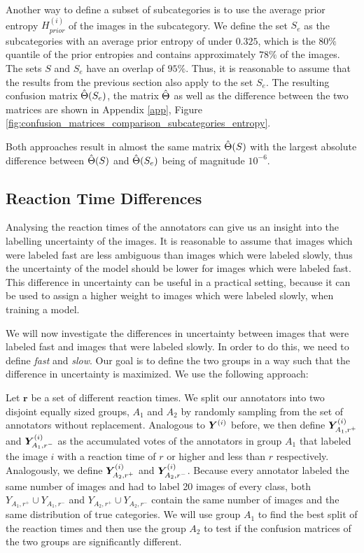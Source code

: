 Another way to define a subset of subcategories is to use the average prior
entropy $H_{prior}^{(i)}$ of the images in the subcategory. We define the set
$S_e$ as the subcategories with an average prior entropy of under $0.325$, which
is the $80\%$ quantile of the prior entropies and contains approximately $78\%$ of
the images. The sets $S$ and $S_e$ have an overlap of $95\%$. Thus, it is
reasonable to assume that the results from the previous section also apply to
the set $S_e$. The resulting confusion matrix $\hat{\Theta}(S_e)$, the matrix
$\hat{\Theta}$ as well as the difference between the two matrices are shown in
Appendix \ref{app}, Figure
\ref{fig:confusion_matrices_comparison_subcategories_entropy}.\bigskip

Both approaches result in almost the same matrix $\hat{\Theta}(S)$ with the largest
absolute difference between $\hat{\Theta}(S)$ and $\hat{\Theta}(S_e)$ being of magnitude
$10^{-6}$.

\subsection{Reaction Time Differences}

Analysing the reaction times of the annotators can give us an insight into the
labelling uncertainty of the images. It is reasonable to assume that images
which were labeled fast are less ambiguous than images which were labeled slowly, thus
the uncertainty of the model should be lower for images which were labeled fast.
This difference in uncertainty can be useful in a practical setting, because
it can be used to assign a higher weight to images which were labeled slowly, when
training a model.\bigskip

We will now investigate the differences in uncertainty between images that were
labeled fast and images that were labeled slowly. In order to do this, we need 
to define \textit{fast} and \textit{slow}. Our goal is to define the two groups
in a way such that the difference in uncertainty is maximized. We use the following
approach:\bigskip

Let $\bm{r}$ be a set of different reaction times. We split our annotators into
two disjoint equally sized groups, $A_1$ and $A_2$ by randomly sampling from the
set of annotators without replacement. Analogous to $\bm{Y}^{(i)}$ before, we then
define $\bm{Y}_{A_1, r^+}^{(i)}$ and $\bm{Y}_{A_1,r^-}^{(i)}$ as the accumulated votes
of the annotators in group $A_1$ that labeled the image $i$ with a reaction time
of $r$ or higher and less than $r$ respectively. Analogously, we define
$\bm{Y}_{A_2, r^+}^{(i)}$ and $\bm{Y}_{A_2, r^-}^{(i)}$. Because every annotator
labeled the same number of images and had to label 20 images of every class,
both $Y_{A_1, r^+} \cup Y_{A_1, r^-}$ and $Y_{A_2, r^+} \cup Y_{A_2, r^-}$
contain the same number of images and the same distribution of true categories.
We will use group $A_1$ to find the best split of the reaction times and
then use the group $A_2$ to test if the confusion matrices of the two groups are
significantly different.\bigskip

